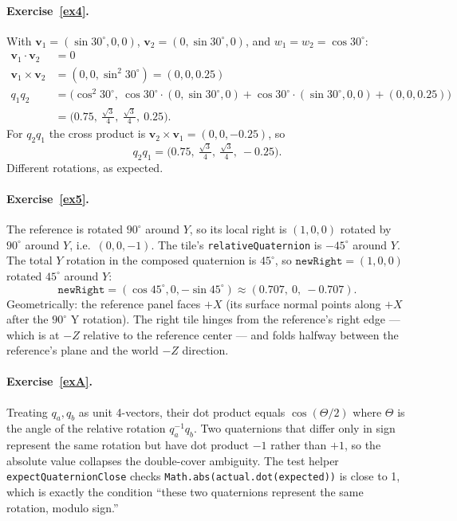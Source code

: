 \documentclass{article}
\begin{document}
\paragraph{Exercise~\ref{ex4}.} With $\mathbf{v}_1 = (\sin 30^\circ, 0, 0)$,
$\mathbf{v}_2 = (0, \sin 30^\circ, 0)$, and $w_1 = w_2 = \cos 30^\circ$:
\begin{align*}
\mathbf{v}_1 \cdot \mathbf{v}_2 &= 0 \\
\mathbf{v}_1 \times \mathbf{v}_2 &= (0, 0, \sin^2 30^\circ) = (0, 0, 0.25) \\
q_1 q_2 &= \bigl(\cos^2 30^\circ,\ \cos 30^\circ \cdot (0, \sin 30^\circ, 0) + \cos 30^\circ \cdot (\sin 30^\circ, 0, 0) + (0, 0, 0.25)\bigr) \\
        &= \bigl(0.75,\ \tfrac{\sqrt{3}}{4},\ \tfrac{\sqrt{3}}{4},\ 0.25\bigr).
\end{align*}
For $q_2 q_1$ the cross product is $\mathbf{v}_2 \times \mathbf{v}_1 = (0, 0, -0.25)$,
so
\[
  q_2 q_1 = \bigl(0.75,\ \tfrac{\sqrt{3}}{4},\ \tfrac{\sqrt{3}}{4},\ -0.25\bigr).
\]
Different rotations, as expected.

\paragraph{Exercise~\ref{ex5}.} The reference is rotated $90^\circ$
around $Y$, so its local right is
$(1,0,0)$ rotated by $90^\circ$ around $Y$, i.e.\ $(0, 0, -1)$. The
tile's \texttt{relativeQuaternion} is $-45^\circ$ around $Y$. The total
$Y$ rotation in the composed quaternion is $45^\circ$, so
$\texttt{newRight} = (1,0,0)$ rotated $45^\circ$ around $Y$:
\[
  \texttt{newRight} = (\cos 45^\circ, 0, -\sin 45^\circ)
                    \approx (0.707,\ 0,\ -0.707).
\]
Geometrically: the reference panel faces $+X$ (its surface normal points
along $+X$ after the $90^\circ$ Y rotation). The right tile hinges from
the reference's right edge --- which is at $-Z$ relative to the
reference center --- and folds halfway between the reference's plane
and the world $-Z$ direction.

\paragraph{Exercise~\ref{exA}.} Treating $q_a, q_b$ as unit 4-vectors,
their dot product equals $\cos(\Theta/2)$ where $\Theta$ is the angle of
the relative rotation $q_a^{-1} q_b$. Two quaternions that differ only
in sign represent the same rotation but have dot product $-1$ rather
than $+1$, so the absolute value collapses the double-cover ambiguity.
The test helper \texttt{expectQuaternionClose} checks
\texttt{Math.abs(actual.dot(expected))} is close to 1, which is exactly
the condition ``these two quaternions represent the same rotation,
modulo sign.''
\end{document}
